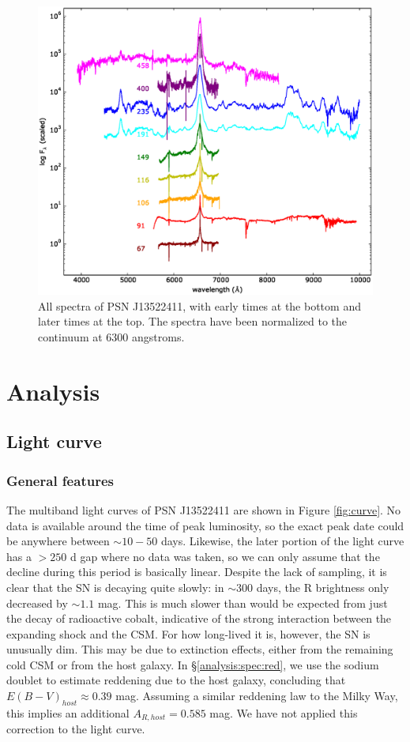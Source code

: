 \documentclass[iop]{emulateapj}
\begin{document}
\begin{figure}
  \centering
  \includegraphics[width=18cm]{graphics/full.eps}
  \caption{All spectra of PSN J13522411, with early times at the bottom and later times at the top. The spectra have been normalized to the continuum at 6300 angstroms.}
  \label{fig:full}
\end{figure}

\section{Analysis} \label{analysis}
\subsection{Light curve} \label{analysis:curve}
\subsubsection{General features} \label{analysis:curve:gen}
The multiband light curves of PSN J13522411 are shown in Figure \ref{fig:curve}. No data is available around the time of peak luminosity, so the exact peak date could be anywhere between $\sim10-50$ days. Likewise, the later portion of the light curve has a $>250$ d gap where no data was taken, so we can only assume that the decline during this period is basically linear. Despite the lack of sampling, it is clear that the SN is decaying quite slowly: in $\sim300$ days, the R brightness only decreased by $\sim1.1$ mag. This is much slower than would be expected from just the decay of radioactive cobalt, indicative of the strong interaction between the expanding shock and the CSM. For how long-lived it is, however, the SN is unusually dim. This may be due to extinction effects, either from the remaining cold CSM or from the host galaxy. In \S \ref{analysis:spec:red}, we use the sodium doublet to estimate reddening due to the host galaxy, concluding that $E(B-V)_{host} \approx 0.39$ mag. Assuming a similar reddening law to the Milky Way, this implies an additional $A_{R,host} = 0.585$ mag. We have not applied this correction to the light curve.
\end{document}
